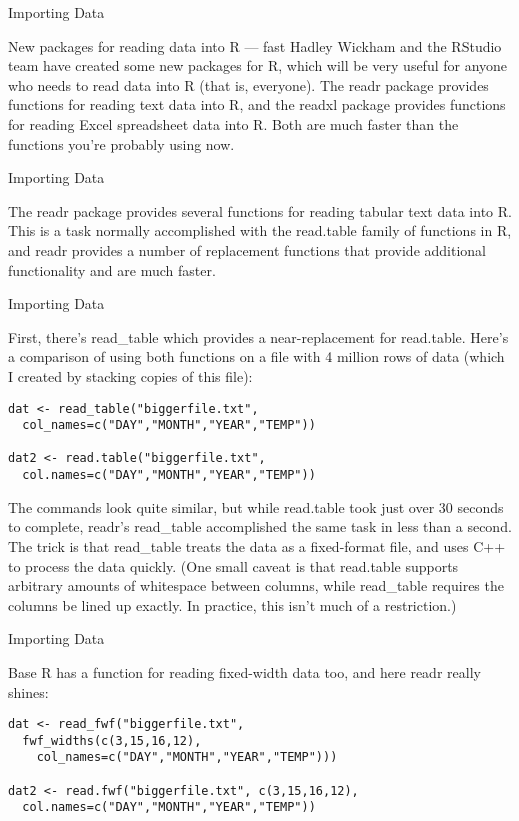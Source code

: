 


{Importing Data}


New packages for reading data into R — fast
Hadley Wickham and the RStudio team have created some new packages for R, which will be very useful for anyone who needs to read data into R (that is, everyone). The readr package provides functions for reading text data into R, and the readxl package provides functions for reading Excel spreadsheet data into R. Both are much faster than the functions you're probably using now.


{Importing Data}


The readr package provides several functions for reading tabular text data into R. This is a task normally accomplished with the read.table family of functions in R, and readr provides a number of replacement functions that provide additional functionality and are much faster.


{Importing Data}


First, there's read_table which provides a near-replacement for read.table. Here's a comparison of using both functions on a file with 4 million rows of data (which I created by stacking copies of this file):
\begin{framed}
\begin{verbatim}
dat <- read_table("biggerfile.txt",
  col_names=c("DAY","MONTH","YEAR","TEMP"))

dat2 <- read.table("biggerfile.txt", 
  col.names=c("DAY","MONTH","YEAR","TEMP"))
\end{verbatim}
\end{framed}
The commands look quite similar, but while read.table took just over 30 seconds to complete, readr's read_table accomplished the same task in less than a second. The trick is that read_table treats the data as a fixed-format file, and uses C++ to process the data quickly. (One small caveat is that read.table supports arbitrary amounts of whitespace between columns, while read_table requires the columns be lined up exactly. In practice, this isn't much of a restriction.)


{Importing Data}


Base R has a function for reading fixed-width data too, and here readr really shines:
\begin{framed}
\begin{verbatim}
dat <- read_fwf("biggerfile.txt", 
  fwf_widths(c(3,15,16,12),
    col_names=c("DAY","MONTH","YEAR","TEMP")))

dat2 <- read.fwf("biggerfile.txt", c(3,15,16,12),
  col.names=c("DAY","MONTH","YEAR","TEMP"))

\end{verbatim}
\end{framed}

